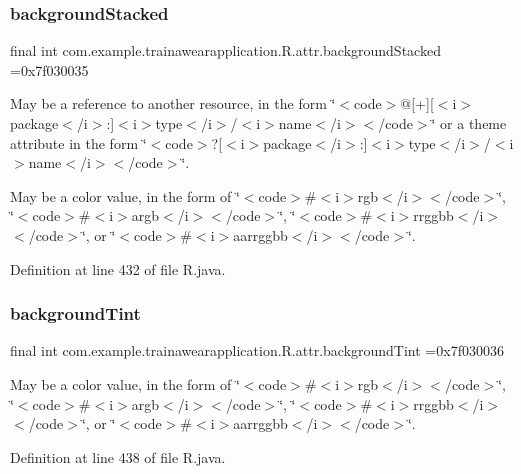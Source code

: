 \subsubsection{\texorpdfstring{backgroundStacked}{backgroundStacked}}
{\footnotesize\ttfamily final int com.\+example.\+trainawearapplication.\+R.\+attr.\+background\+Stacked =0x7f030035\hspace{0.3cm}{\ttfamily [static]}}

May be a reference to another resource, in the form \char`\"{}$<$code$>$@\mbox{[}+\mbox{]}\mbox{[}$<$i$>$package$<$/i$>$\+:\mbox{]}$<$i$>$type$<$/i$>$/$<$i$>$name$<$/i$>$$<$/code$>$\char`\"{} or a theme attribute in the form \char`\"{}$<$code$>$?\mbox{[}$<$i$>$package$<$/i$>$\+:\mbox{]}$<$i$>$type$<$/i$>$/$<$i$>$name$<$/i$>$$<$/code$>$\char`\"{}. 

May be a color value, in the form of \char`\"{}$<$code$>$\#$<$i$>$rgb$<$/i$>$$<$/code$>$\char`\"{}, \char`\"{}$<$code$>$\#$<$i$>$argb$<$/i$>$$<$/code$>$\char`\"{}, \char`\"{}$<$code$>$\#$<$i$>$rrggbb$<$/i$>$$<$/code$>$\char`\"{}, or \char`\"{}$<$code$>$\#$<$i$>$aarrggbb$<$/i$>$$<$/code$>$\char`\"{}. 

Definition at line 432 of file R.\+java.

\mbox{\label{classcom_1_1example_1_1trainawearapplication_1_1_r_1_1attr_a37db0456271aa1e6054982cb37c1363c}} 
\subsubsection{\texorpdfstring{backgroundTint}{backgroundTint}}
{\footnotesize\ttfamily final int com.\+example.\+trainawearapplication.\+R.\+attr.\+background\+Tint =0x7f030036\hspace{0.3cm}{\ttfamily [static]}}

May be a color value, in the form of \char`\"{}$<$code$>$\#$<$i$>$rgb$<$/i$>$$<$/code$>$\char`\"{}, \char`\"{}$<$code$>$\#$<$i$>$argb$<$/i$>$$<$/code$>$\char`\"{}, \char`\"{}$<$code$>$\#$<$i$>$rrggbb$<$/i$>$$<$/code$>$\char`\"{}, or \char`\"{}$<$code$>$\#$<$i$>$aarrggbb$<$/i$>$$<$/code$>$\char`\"{}. 

Definition at line 438 of file R.\+java.


